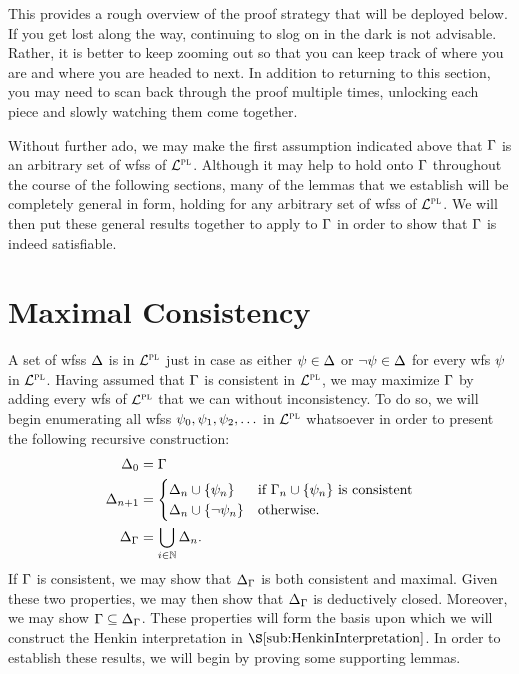 This provides a rough overview of the proof strategy that will be deployed below.
If you get lost along the way, continuing to slog on in the dark is not advisable.
Rather, it is better to keep zooming out so that you can keep track of where you are and where you are headed to next.
In addition to returning to this section, you may need to scan back through the proof multiple times, unlocking each piece and slowly watching them come together.

Without further ado, we may make the first assumption indicated above that $\Gamma$ is an arbitrary set of wfss of $\mathcal{L}^{\textsc{pl}}$. 
Although it may help to hold onto $\Gamma$ throughout the course of the following sections, many of the lemmas that we establish will be completely general in form, holding for any arbitrary set of wfss of $\mathcal{L}^{\textsc{pl}}$.
We will then put these general results together to apply to $\Gamma$ in order to show that $\Gamma$ is indeed satisfiable. 


\section{Maximal Consistency}%
  \label{sec:PL-Maximization}
  
A set of wfss $\Delta$ is  in $\mathcal{L}^{\textsc{pl}}$ just in case as either $\psi\in\Delta$ or $\neg\psi\in\Delta$ for every wfs $\psi$ in $\mathcal{L}^{\textsc{pl}}$.
Having assumed that $\Gamma$ is consistent in $\mathcal{L}^{\textsc{pl}}$, we may maximize $\Gamma$ by adding every wfs of $\mathcal{L}^{\textsc{pl}}$ that we can without inconsistency. 
To do so, we will begin enumerating all wfss $\psi_0,\psi_1,\psi_2,\ldots$ in $\mathcal{L}^{\textsc{pl}}$ whatsoever in order to present the following recursive construction:
\begin{align*}
  \Delta_0     &= \Gamma \\
  \Delta_{n+1} &= 
    \begin{cases}
      \Delta_n\cup\lbrace\psi_n\rbrace &\text{if } \Gamma_n\cup\lbrace\psi_n\rbrace \text{ is consistent}\\
      \Delta_n\cup\lbrace\neg\psi_n\rbrace &\text{otherwise}.
    \end{cases}\\
  \Delta_{\Gamma} &= \bigcup_{i\in\mathbb{N}}\Delta_n. 
\end{align*}
If $\Gamma$ is consistent, we may show that $\Delta_{\Gamma}$ is both consistent and maximal.
Given these two properties, we may then show that $\Delta_{\Gamma}$ is deductively closed.
Moreover, we may show $\Gamma\subseteq\Delta_{\Gamma}$.
These properties will form the basis upon which we will construct the Henkin interpretation in $\S\ref{sub:HenkinInterpretation}$.
In order to establish these results, we will begin by proving some supporting lemmas.


